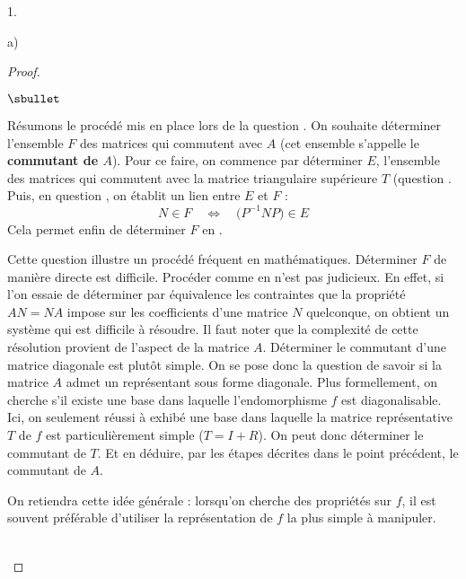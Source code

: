 \documentclass[11pt]{article}%
\begin{document}
\begin{noliste}{1.}
\begin{noliste}{a)}
\begin{proof}
    \begin{remarkL}{.98}
      \begin{noliste}{$\sbullet$}
      \item Résumons le procédé mis en place lors de la question
        . On souhaite déterminer l'ensemble $F$ des matrices
        qui commutent avec $A$ (cet ensemble s'appelle le {\bf
          commutant de $A$}). Pour ce faire, on commence par
        déterminer $E$, l'ensemble des matrices qui commutent avec la
        matrice triangulaire supérieure $T$ (question
        .\\
        Puis, en question , on établit un lien entre $E$ et
        $F$ :
        \[
        N \in F \quad \Leftrightarrow \quad \big( P^{-1} N P \big) \in
        E
        \]
        Cela permet enfin de déterminer $F$ en .

      \item Cette question  illustre un procédé fréquent en
        mathématiques. Déterminer $F$ de manière directe est
        difficile. Procéder comme en  n'est pas
        judicieux. En effet, si l'on essaie de déterminer par
        équivalence les contraintes que la propriété $AN = NA$ impose
        sur les coefficients d'une matrice $N$ quelconque, on obtient
        un système qui est difficile à résoudre. Il faut noter que la
        complexité de cette résolution provient de l'aspect de la
        matrice $A$. Déterminer le commutant d'une matrice diagonale
        est plutôt simple. On se pose donc la question de savoir si la
        matrice $A$ admet un représentant sous forme diagonale. Plus
        formellement, on cherche s'il existe une base dans laquelle
        l'endomorphisme $f$ est diagonalisable. Ici, on seulement
        réussi à exhibé une base dans laquelle la matrice
        représentative $T$ de $f$ est particulièrement simple ($T = I
        + R$). On peut donc déterminer le commutant de $T$. Et en
        déduire, par les étapes décrites dans le point précédent, le
        commutant de $A$.

      \item On retiendra cette idée générale : lorsqu'on cherche des
        propriétés sur $f$, il est souvent préférable d'utiliser la
        représentation de $f$ la plus simple à manipuler.
      \end{noliste}
    \end{remarkL}~\\[-1.4cm]
  \end{proof}

  \end{noliste}
\end{noliste}
\end{document}

